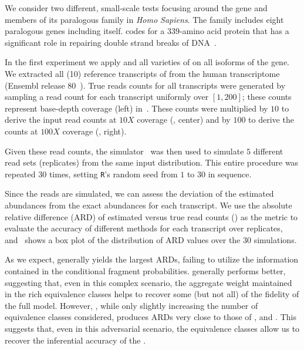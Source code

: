 We consider two different, small-scale tests focusing around the gene
 and members of its paralogous family in \emph{Homo Sapiens}. 
The  family includes eight paralogous genes including
 itself.  codes for a $339$-amino acid protein that has
a significant role in repairing double strand breaks of DNA~\citep{yates2015ensembl}.

In the first experiment we apply \rsem and all varieties of \salmon on all
isoforms of the  gene. We extracted all (10) reference transcripts of
 from the human transcriptome (Ensembl release 80~\citep{yates2015ensembl}). True reads
counts for all transcripts were generated by sampling a read count for each
transcript uniformly over $\left[1,200\right]$; these counts represent base-depth
coverage (left) in~.  These counts were multiplied by $10$ to
derive the input read counts at $10X$ coverage (, center) and
by $100$ to derive the counts at $100X$ coverage (, right).

Given these read counts, the \polyester simulator~\citep{frazee2015polyester} was
then used to simulate $5$ different read sets (replicates) from the same input
distribution. This entire procedure was repeated $30$ times, setting 
\texttt{R}'s random seed from $1$ to $30$ in sequence.

Since the reads are simulated, we can assess the deviation of the estimated
abundances from the exact abundances for each transcript. We use the absolute 
relative difference (ARD) of estimated versus true read counts
() as the metric to evaluate the accuracy of different methods for
each transcript over replicates, and~ shows a box plot of the
distribution of ARD values over the $30$ simulations.

As we expect, \salmonu generally yields the largest ARDs, failing to utilize the
information contained in the conditional fragment probabilities. \salmon
generally performs better, suggesting that, even in this complex scenario, the
aggregate weight maintained in the rich equivalence classes helps to recover
some (but not all) of the fidelity of the full model. However, \salmonrf, while
only slightly increasing the number of equivalence classes considered, produces
ARDs very close to those of \rsem, \expressEM and \salmonfm. This suggests that, even in
this adversarial scenario, the \rangebased equivalence classes allow us to
recover the inferential accuracy of the \fm.

